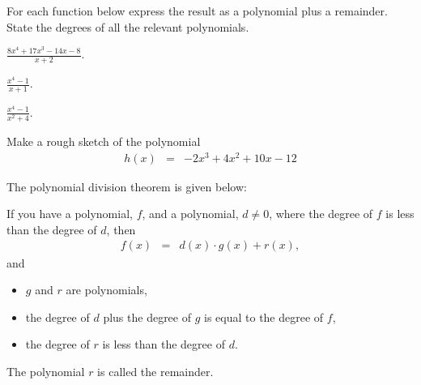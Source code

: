 \begin{problem}
\item For each function below express the result as a polynomial plus
  a remainder. State the degrees of all the relevant polynomials.
  \begin{subproblem}
  \item ${\displaystyle \frac{8x^4+17x^3-14x-8}{x+2} }$.
    \vfill
  \item ${\displaystyle \frac{x^4-1}{x+1} }$.
    \vfill
  \item ${\displaystyle \frac{x^4-1}{x^2+4} }$.
    \vfill
  \end{subproblem}

  \clearpage
  
\item Make a rough sketch of the polynomial
  \begin{eqnarray*}
    h(x) & = & -2x^3+4x^2+10x-12
  \end{eqnarray*}


  \vfill

  \clearpage

\item The polynomial division theorem is given below:

  If you have a polynomial, $f$, and a polynomial, $d \neq 0$, where the
  degree of $f$ is less than the degree of $d$, then 
  \begin{eqnarray*}
    f(x) & = & d(x)\cdot g(x) + r(x),
  \end{eqnarray*}
  and
  \begin{itemize}
  \item $g$ and $r$ are polynomials,
  \item the degree of $d$ plus the degree of $g$ is equal to the
    degree of $f$,
  \item the degree of $r$ is less than the degree of $d$.
  \end{itemize}
  The polynomial $r$ is called the remainder.


\end{problem}
